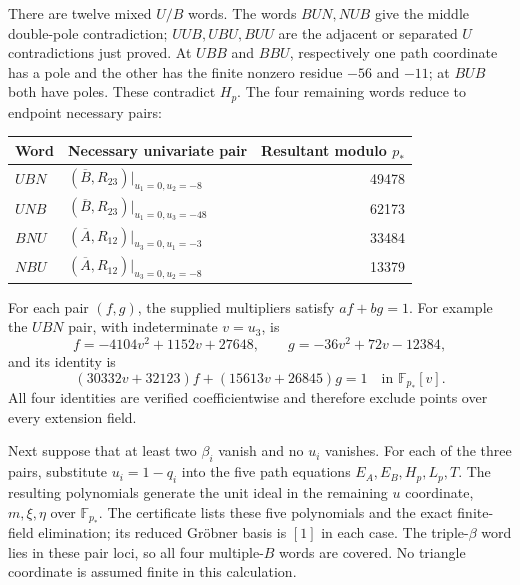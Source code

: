 \documentclass[11pt,a4paper]{article}
\theoremstyle{remark}\newtheorem{remark}[theorem]{Remark}
\newcommand{\Ab}{\overline A}\newcommand{\Bb}{\overline B}
\begin{document}
There are twelve mixed $U/B$ words. The words $BUN,NUB$ give the middle
double-pole contradiction; $UUB,UBU,BUU$ are the adjacent or separated
$U$ contradictions just proved. At $UBB$ and $BBU$, respectively one
path coordinate has a pole and the other has the finite nonzero residue
$-56$ and $-11$; at $BUB$ both have poles. These contradict $H_p$.
The four remaining words reduce to endpoint necessary pairs:
\begin{center}\small
\begin{tabular}{@{}llr@{}}\toprule
Word & Necessary univariate pair & Resultant modulo $p_*$\\\midrule
$UBN$ & $(\Bb,R_{23})|_{u_1=0,u_2=-8}$ &49478\\
$UNB$ & $(\Bb,R_{23})|_{u_1=0,u_3=-48}$ &62173\\
$BNU$ & $(\Ab,R_{12})|_{u_3=0,u_1=-3}$ &33484\\
$NBU$ & $(\Ab,R_{12})|_{u_3=0,u_2=-8}$ &13379\\
\bottomrule\end{tabular}
\end{center}
For each pair $(f,g)$, the supplied multipliers satisfy $af+bg=1$.
For example the $UBN$ pair, with indeterminate $v=u_3$, is
\[
 f=-4104v^2+1152v+27648,\qquad
 g=-36v^2+72v-12384,
\]
and its identity is
\[
 (30332v+32123)f+(15613v+26845)g=1
 \quad\text{in }\mathbb F_{p_*}[v].
\]
All four identities are verified coefficientwise and therefore exclude
points over every extension field.

Next suppose that at least two $\beta_i$ vanish and no $u_i$ vanishes.
For each of the three pairs, substitute $u_i=1-q_i$ into the five path
equations $E_A,E_B,H_p,L_p,T$. The resulting polynomials generate the
unit ideal in the remaining $u$ coordinate, $m,\xi,\eta$ over
$\mathbb F_{p_*}$. The certificate lists these five polynomials and the
exact finite-field elimination; its reduced Gr\"obner basis is $[1]$ in
each case. The triple-$\beta$ word lies in these pair loci, so all four
multiple-$B$ words are covered. No triangle coordinate is assumed finite
in this calculation.
\end{document}
